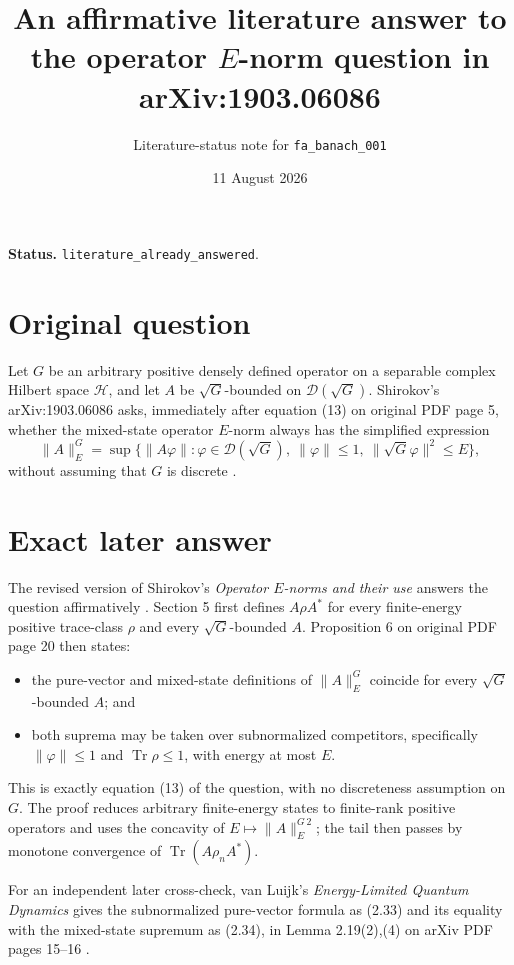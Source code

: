 \documentclass[11pt]{article}
\title{An affirmative literature answer to the operator $E$-norm question in arXiv:1903.06086}
\author{Literature-status note for \texttt{fa\_banach\_001}}
\date{11 August 2026}
\newcommand{\Hh}{\mathcal H}
\newcommand{\D}{\mathcal D}
\newcommand{\Tr}{\operatorname{Tr}}
\begin{document}
\maketitle

\noindent\textbf{Status.}
\texttt{literature\_already\_answered}.

\section*{Original question}

Let $G$ be an arbitrary positive densely defined operator on a separable
complex Hilbert space $\Hh$, and let $A$ be $\sqrt G$-bounded on
$\D(\sqrt G)$.  Shirokov's arXiv:1903.06086 asks, immediately after equation
(13) on original PDF page 5, whether the mixed-state operator $E$-norm always
has the simplified expression
\[
 \|A\|_E^G
 =\sup\bigl\{\|A\varphi\|:\varphi\in\D(\sqrt G),\
       \|\varphi\|\leq1,\ \|\sqrt G\varphi\|^2\leq E\bigr\},
\]
without assuming that $G$ is discrete \cite{ShirokovExtension}.

\section*{Exact later answer}

The revised version of Shirokov's \emph{Operator $E$-norms and their use}
answers the question affirmatively \cite{ShirokovENorms}.  Section 5 first
defines $A\rho A^*$ for every finite-energy positive trace-class $\rho$ and
every $\sqrt G$-bounded $A$.  Proposition 6 on original PDF page 20 then
states:
\begin{itemize}
  \item the pure-vector and mixed-state definitions of $\|A\|_E^G$ coincide
        for every $\sqrt G$-bounded $A$; and
  \item both suprema may be taken over subnormalized competitors,
        specifically $\|\varphi\|\leq1$ and $\Tr\rho\leq1$, with energy at
        most $E$.
\end{itemize}
This is exactly equation (13) of the question, with no discreteness assumption
on $G$.  The proof reduces arbitrary finite-energy states to finite-rank
positive operators and uses the concavity of $E\mapsto\|A\|_E^{G\,2}$; the
tail then passes by monotone convergence of $\Tr(A\rho_nA^*)$.

For an independent later cross-check, van Luijk's \emph{Energy-Limited Quantum
Dynamics} gives the subnormalized pure-vector formula as (2.33) and its
equality with the mixed-state supremum as (2.34), in Lemma 2.19(2),(4) on
arXiv PDF pages 15--16 \cite{vanLuijk}.
\end{document}
